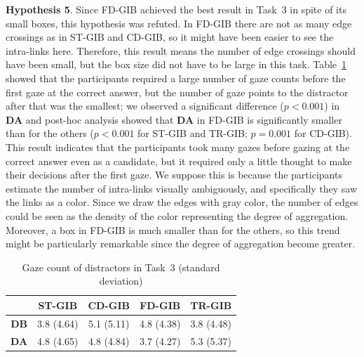\documentclass[review]{vgtc}                 %
\begin{document}
{\bf Hypothesis 5}. Since FD-GIB achieved the best result in Task~3 in spite of its small boxes, this hypothesis was refuted. In FD-GIB there are not as many edge crossings as in ST-GIB and CD-GIB, so it might have been easier to see the intra-links here. Therefore, this result means the number of edge crossings should have been small, but the box size did not have to be large in this task.
Table~\ref{table-dist3} showed that the participants required a large number of gaze counts before the first gaze at the correct answer, but the number of gaze points to the distractor after that was the smallest; we observed a significant difference ($p<0.001$) in {\bf DA} and post-hoc analysis showed that {\bf DA} in FD-GIB is significantly smaller than for the others ($p<0.001$ for ST-GIB and TR-GIB; $p=0.001$ for CD-GIB).
This result indicates that the participants took many gazes before gazing at the correct answer even as a candidate, but it required only a little thought to make their decisions after the first gaze.
We suppose this is because the participants estimate the number of intra-links visually ambiguously, and specifically they saw the links as a color.
Since we draw the edges with gray color, the number of edges could be seen as the density of the color representing the degree of aggregation.
Moreover, a box in FD-GIB is much smaller than for the others, so this trend might be particularly remarkable since the degree of aggregation become greater.

  
\begin{table}[b]  
  \begin{center}
   \caption{Gaze count of distractors in Task~3 (standard deviation)}
  \label{table-dist3}
    \begin{tabular}{|c|c|c|c|c|} \hline
      & ST-GIB & CD-GIB & FD-GIB & TR-GIB \\ \hline
      {\bf DB} & 3.8 (4.64) & 5.1 (5.11) & 4.8 (4.38) & 3.8 (4.48) \\ \hline
      {\bf DA} & 4.8 (4.65) & 4.8 (4.84) & 3.7 (4.27) & 5.3 (5.37) \\ \hline
    \end{tabular}
  \end{center}
\end{table}
\end{document}
